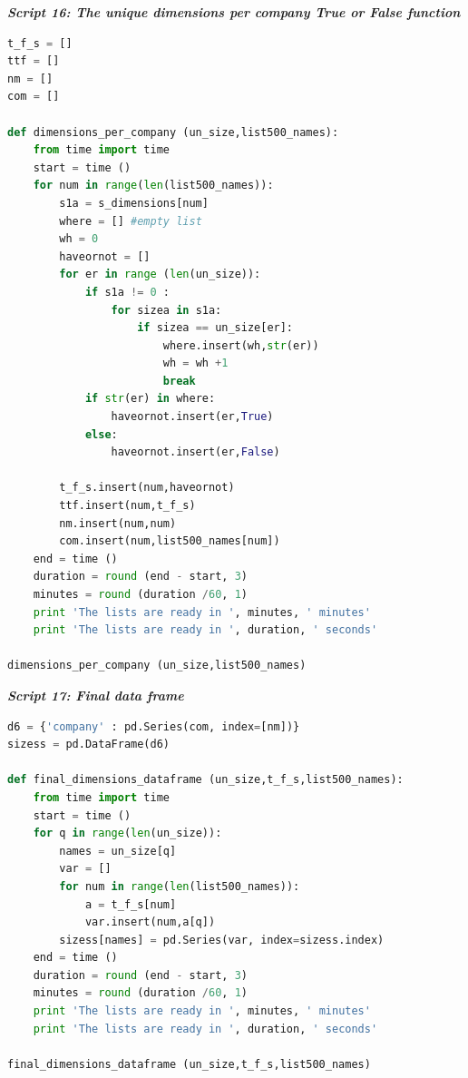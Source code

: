 \documentclass{article}
\begin{document}
\begin{center}
\textit{\textbf{Script 16: The unique dimensions per company True or False function}}\label{p16}
\end{center}
\begin{lstlisting}[language=Python]
t_f_s = []
ttf = []
nm = []
com = []

def dimensions_per_company (un_size,list500_names):
    from time import time     
    start = time ()
    for num in range(len(list500_names)): 
        s1a = s_dimensions[num] 
        where = [] #empty list
        wh = 0
        haveornot = []
        for er in range (len(un_size)):
            if s1a != 0 :
                for sizea in s1a:
                    if sizea == un_size[er]:
                        where.insert(wh,str(er))
                        wh = wh +1
                        break
            if str(er) in where:
                haveornot.insert(er,True)                    
            else:
                haveornot.insert(er,False)
                    
        t_f_s.insert(num,haveornot)
        ttf.insert(num,t_f_s)
        nm.insert(num,num)
        com.insert(num,list500_names[num])
    end = time ()
    duration = round (end - start, 3)
    minutes = round (duration /60, 1)
    print 'The lists are ready in ', minutes, ' minutes'
    print 'The lists are ready in ', duration, ' seconds'

dimensions_per_company (un_size,list500_names)
\end{lstlisting}

\begin{center}
\textit{\textbf{Script 17: Final data frame }}\label{p17}
\end{center}
\begin{lstlisting}[language=Python]
d6 = {'company' : pd.Series(com, index=[nm])}
sizess = pd.DataFrame(d6)   

def final_dimensions_dataframe (un_size,t_f_s,list500_names):
    from time import time 
    start = time ()
    for q in range(len(un_size)):
        names = un_size[q]
        var = []
        for num in range(len(list500_names)):
            a = t_f_s[num]
            var.insert(num,a[q])
        sizess[names] = pd.Series(var, index=sizess.index) 
    end = time ()
    duration = round (end - start, 3)
    minutes = round (duration /60, 1)
    print 'The lists are ready in ', minutes, ' minutes'
    print 'The lists are ready in ', duration, ' seconds'

final_dimensions_dataframe (un_size,t_f_s,list500_names)
\end{lstlisting}
\end{document}
